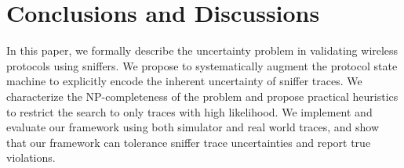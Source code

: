 \section{Conclusions and Discussions}
\label{sec:conclusion}

In this paper, we formally describe the uncertainty problem in validating
wireless protocols using sniffers. We propose to systematically augment the
protocol state machine to explicitly encode the inherent uncertainty of sniffer
traces. We characterize the NP-completeness of the problem and propose practical
heuristics to restrict the search to only traces with high likelihood.  We
implement and evaluate our framework using both \ns{} simulator and real world
traces, and show that our framework can tolerance sniffer trace uncertainties
and report true violations.

\begin{comment}
Finally, we discuss a few challenges and future
directions.

\textbf{Verification Coverage.} Given a single sniffer trace, it is possible
that not all the states in the state machine are visited during the verification
process. For instance, a rate control state machine based on certain consecutive
packet losses patterns can not be verified if no such consecutive losses appear
in the sniffer trace. In general, given a protocol state machine, how to extract
the packet patterns for each state to be reached and how to alter the testing
such that such patterns can be observed?

\textbf{State Machine Generation.} We manually translated the protocols studied
in this paper into checker state machines based on the source code, comments and
documentation. The process is time-consuming and error-prone. A more scalable
approach would be taking the protocol specification written in certain formal
language, and automatically translate such specification into state machines
that can be used for verification process.

\end{comment}
